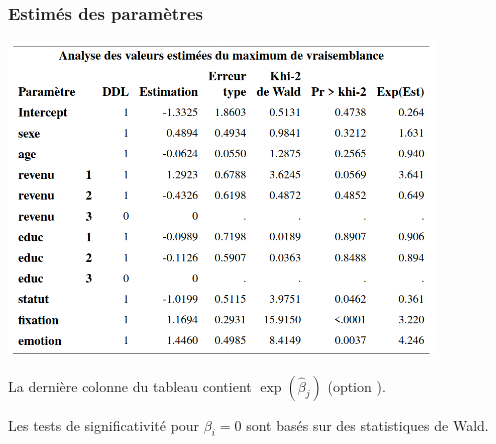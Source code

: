 \documentclass{beamer}
\begin{document}
\begin{frame}
\frametitle{Estimés des paramètres}
\begin{center}
\includegraphics[width = 0.85\textwidth]{img/c4/diapos8-e13}
\end{center}
{\footnotesize 
\bi
\item La dernière colonne du tableau contient $\exp(\hat{\beta}_j)$ (option ).
\item Les tests de significativité pour $\beta_i=0$ sont basés sur des statistiques de Wald.
\ei

}
\end{frame}
\end{document}
